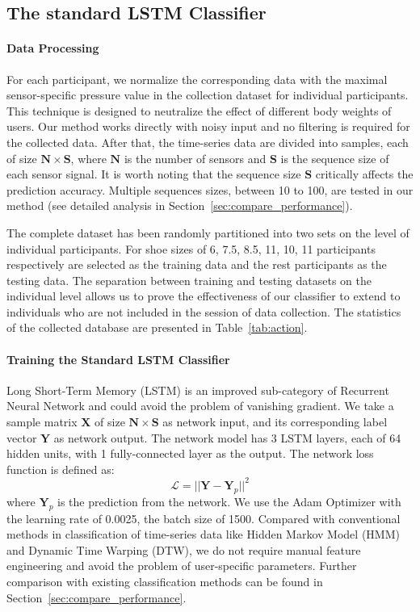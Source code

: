 \documentclass[review]{vgtc}                 %
\begin{document}
\subsection{The standard LSTM Classifier}
\paragraph{Data Processing}
For each participant, we normalize the corresponding data with the maximal sensor-specific pressure value in the collection dataset for individual participants. 
This technique is designed to neutralize the effect of different body weights of users.
Our method works directly with noisy input and no filtering is required for the collected data.
After that, the time-series data are divided into samples, each of size $\mathbf{N}\times\mathbf{S}$, where $\mathbf{N}$ is the number of sensors and $\mathbf{S}$ is the sequence size of each sensor signal. 
It is worth noting that the sequence size $\mathbf{S}$ critically affects the prediction accuracy.
Multiple sequences sizes, between 10 to 100, are tested in our method (see detailed analysis in Section~\ref{sec:compare_performance}).

The complete dataset has been randomly partitioned into two sets on the level of individual participants.
For shoe sizes of 6, 7.5, 8.5, 11, 10, 11 participants respectively are selected as the training data and the rest participants as the testing data. 
The separation between training and testing datasets on the individual level allows us to prove the effectiveness of our classifier to extend to individuals who are not included in the session of data collection.
The statistics of the collected database are presented in Table~\ref{tab:action}.

\paragraph{Training the Standard LSTM Classifier}
Long Short-Term Memory (LSTM) is an improved sub-category of Recurrent Neural Network and could avoid the problem of vanishing gradient. 
We take a sample matrix $\mathbf{X}$ of size $\mathbf{N}\times\mathbf{S}$ as network input, and its corresponding label vector $\mathbf{Y}$ as network output.
The network model has 3 LSTM layers, each of 64 hidden units, with 1 fully-connected layer as the output. 
The network loss function is defined as:
\begin{equation}
    \mathcal{L} = || \mathbf{Y} - \mathbf{Y}_p ||^2
\end{equation}
where $\mathbf{Y}_p$ is the prediction from the network.
We use the Adam Optimizer with the learning rate of 0.0025, the batch size of 1500. 
Compared with conventional methods in classification of time-series data like Hidden Markov Model (HMM) and Dynamic Time Warping (DTW), we do not require manual feature engineering and avoid the problem of user-specific parameters. 
Further comparison with existing classification methods can be found in Section~\ref{sec:compare_performance}.
\end{document}
